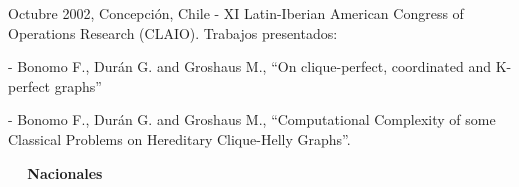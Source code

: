 \begin{compactitem}
\smallskip

\item Octubre 2002, Concepci\'on, Chile - XI Latin-Iberian
American Congress of Operations Research (CLAIO). Trabajos
presentados:
\begin{compactitem}
\item[-] Bonomo F., Dur\'an G. and Groshaus M., ``On
clique-perfect, coordinated and K-perfect graphs'' \item[-] Bonomo
F., Dur\'an G. and Groshaus M., ``Computational Complexity of some
Classical Problems on Hereditary Clique-Helly Graphs''.
\end{compactitem}

\end{compactitem}

\bigskip

\textbf{$\quad$ Nacionales}

\smallskip

